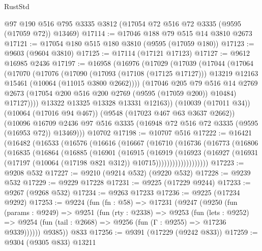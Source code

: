 \begin{lexlean}{RustStd}
\begin{coremodule}
    @97
    @190
    @516
    @795
    @3335
    @3812
    (@17054 @72 @516 @72 @3335 (@9595 (@17059 @72)) @13469)
@17114 := @17046 @188 @79 @515 @14 @3810 @2673
@17121 := @17054 @180 @515 @180 @3810 (@9595 (@17059 @180))
@17123 := @9603 (@9604 @3810)
@17125 := @17114 (@17121 @17123)
@17127 := @9612 @16985 @2436
@17197 := @16958
    (@16976
      (@17029
        (@17039
          (@17044
            (@17064
              (@17070
                (@17076
                  (@17090
                    (@17093 (@17108 (@17125 @17127)))
                    @13219
                    @12163
                    @15461
                    (@10064 (@11015 @3800 @2662))))
                (@17046
                  @205
                  @79
                  @516
                  @14
                  @2769
                  @2673
                  (@17054 @200 @516 @200 @2769 (@9595 (@17059 @200)) @10484)
                  @17127))))
          @13322
          @13325
          @13328
          @13331
          @12163))
      (@10039 (@17011 @34))
      (@10064 (@17016 @94 @467))
      (@9548 (@17023 @467 @63 @3637 @2662))
      (@10096 @16709 @2436 @97 @516 @3335 (@16948 @72 @516 @72 @3335 (@9595 (@16953 @72)) @13469)))
    @10702
@17198 := @10707 @516
@17222 := @16421
    (@16482
      (@16533
        (@16576
          (@16616
            (@16667
              (@16710
                (@16736
                  (@16773
                    (@16806
                      (@16835
                        (@16864
                          (@16885
                            (@16901
                              (@16915
                                (@16919
                                  (@16923
                                    (@16927
                                      (@16931
                                        (@17197
                                          (@10064 (@17198 @821 @312))
                                          @10715)))))))))))))))))))
@17223 := @9208 @532
@17227 := @9210 (@9214 @532) (@9220 @532)
@17228 := @9239 @532
@17229 := @9229 @17228
@17231 := @9225 (@17229 @9244)
@17233 := @9267 (@9268 @532)
@17234 := @9263 @17233
@17236 := @9225 (@17234 @9292)
@17253 := @9224
    (fun (fn : @58) =>
    @17231
      (@9247
        (@9250
          (fun (params : @9249) =>
          @9251
            (fun (rty : @2338) =>
            @9253
              (fun (lets : @9252) =>
              @9254 (fun (tail : @2668) => @9256 (fun (Γ : @9255) => @17236 @9339))))))
        @9385))
    @833
@17256 := @9391 (@17229 (@9242 @833))
@17259 := @9304 (@9305 @833) @13211

\end{coremodule}
\end{lexlean}
